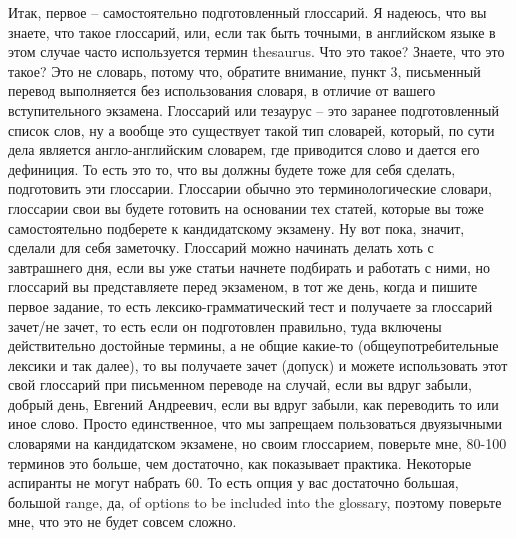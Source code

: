 \documentclass[main.tex]{subfiles}
\begin{document}
 Итак, первое -- самостоятельно подготовленный глоссарий.
 Я надеюсь, что вы знаете, что такое глоссарий, или, если так быть точными, в английском языке в этом случае часто используется термин thesaurus.
Что это такое?
Знаете, что это такое?
Это не словарь, потому что, обратите внимание, пункт 3, письменный перевод выполняется без использования словаря, в отличие от вашего вступительного экзамена.
Глоссарий или тезаурус -- это заранее подготовленный список слов, ну а вообще это существует такой тип словарей, который, по сути дела является англо-английским словарем, где приводится слово и дается его дефиниция.
То есть это то, что вы должны будете тоже для себя сделать, подготовить эти глоссарии.
Глоссарии обычно это терминологические словари, глоссарии свои вы будете готовить на основании тех статей, которые вы тоже самостоятельно подберете к кандидатскому экзамену.
Ну вот пока, значит, сделали для себя заметочку.
Глоссарий можно начинать делать хоть с завтрашнего дня, если вы уже статьи начнете подбирать и работать с ними, но глоссарий вы представляете перед экзаменом, в тот же день, когда и пишите первое задание, то есть лексико-грамматический тест и получаете за глоссарий зачет/не зачет, то есть если он подготовлен правильно, туда включены действительно достойные термины, а не общие какие-то (общеупотребительные лексики и так далее), то вы получаете зачет (допуск) и можете использовать этот свой глоссарий при письменном переводе на случай, если вы вдруг забыли, добрый день, Евгений Андреевич, если вы вдруг забыли, как переводить то или иное слово.
Просто единственное, что мы запрещаем пользоваться двуязычными словарями на кандидатском экзамене, но своим глоссарием, поверьте мне, 80-100 терминов это больше, чем достаточно, как показывает практика.
Некоторые аспиранты не могут набрать 60.
То есть опция у вас достаточно большая, большой range, да, of options to be included into the glossary, поэтому поверьте мне, что это не будет совсем сложно.
\end{document}
